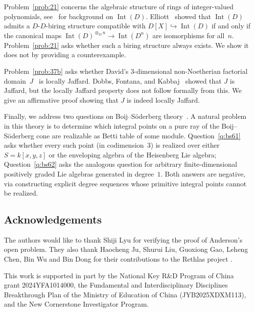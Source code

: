 \documentclass[11pt,reqno]{amsart}
\numberwithin{equation}{section}
\theoremstyle{definition}
\begin{document}
Problem~\ref{prob:21} concerns the algebraic structure of rings of
integer-valued polynomials, see~\cite{CahenChabert1997} for background
on $\operatorname{Int}(D)$.
Elliott~\cite{Elliott2010-Plethories} showed that
$\operatorname{Int}(D)$ admits a $D$-$D$-biring structure compatible
with $D[X]\hookrightarrow\operatorname{Int}(D)$ if and only if the
canonical maps
$\operatorname{Int}(D)^{\otimes_D n}\to\operatorname{Int}(D^n)$ are
isomorphisms for all~$n$. Problem~\ref{prob:21} asks whether such a
biring structure always exists. We show it does not by providing a counterexample.

Problem~\ref{prob:37b} asks whether David's $3$-dimensional
non-Noetherian factorial domain~$J$~\cite{David1973} is locally Jaffard.
Dobbs, Fontana, and Kabbaj~\cite{DobbsFontanaKabbaj1990} showed that $J$
is Jaffard, but the locally Jaffard property does not follow formally
from this. We give an affirmative
proof showing that $J$ is indeed locally Jaffard.

Finally, we address two questions on Boij--S\"oderberg
theory~\cite{BoijSoderberg2008,EisenbudSchreyer2009}. A natural problem
in this theory is to determine which integral points on a pure ray of the
Boij--S\"oderberg cone are realizable as Betti table of some module.
Question~\ref{q:bs61} asks whether every such point (in codimension~$3$)
is realized over either $S=k[x,y,z]$ or the enveloping algebra of the
Heisenberg Lie algebra; Question~\ref{q:bs62} asks the analogous question
for arbitrary finite-dimensional positively graded Lie algebras generated
in degree~$1$. Both answers are negative, via constructing explicit degree sequences
whose primitive integral points cannot be realized.

\subsection*{Acknowledgements} The authors would like to thank Shiji Lyu for verifying the proof of Anderson's open problem.
They also thank Haocheng Ju, Shurui Liu, Guoxiong Gao, Leheng Chen, Bin Wu and
Bin Dong for their contributions to the Rethlas project
\cite{JuEtAl2026Rethlas}.

This work is supported in part by the National Key R\&D Program of China grant 2024YFA1014000, the Fundamental and Interdisciplinary Disciplines Breakthrough Plan of the Ministry of Education of China (JYB2025XDXM113), and the New Cornerstone Investigator Program.

\end{document}
